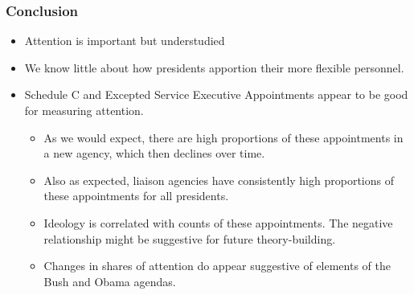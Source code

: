 \documentclass{beamer}
\begin{document}
\begin{frame}[fragile]

\frametitle{Conclusion}
\begin{itemize}\addtolength{\itemsep}{0.5\baselineskip}
\item Attention is important but understudied
\item We know little about how presidents apportion their more flexible personnel.
\item Schedule C and Excepted Service Executive Appointments appear to be good for measuring attention.
\begin{itemize}
\item As we would expect, there are high proportions of these appointments in a new agency, which then declines over time.
\item Also as expected, liaison agencies have consistently high proportions of these appointments for all presidents.
\item Ideology is correlated with counts of these appointments. The negative relationship might be suggestive for future theory-building.
\item Changes in shares of attention do appear suggestive of elements of the Bush and Obama agendas. 
\end{itemize}

\end{itemize}
\end{frame}
\end{document}
